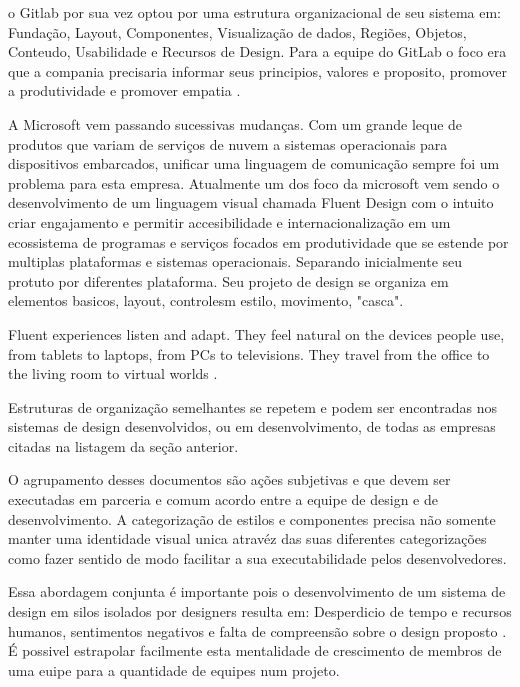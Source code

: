   o Gitlab por sua vez optou por uma estrutura organizacional de seu sistema em: Fundação, Layout, Componentes, Visualização de dados, Regiões, Objetos, Conteudo, Usabilidade e Recursos de Design. Para a equipe do GitLab o foco era que a compania precisaria informar seus principios, valores e proposito, promover a produtividade e promover empatia \cite{gitlab_design}.

  A Microsoft vem passando sucessivas mudanças. Com um grande leque de produtos que variam de serviços de nuvem a sistemas operacionais para dispositivos embarcados, unificar uma linguagem de comunicação sempre foi um problema para esta empresa. Atualmente um dos foco da microsoft vem sendo o desenvolvimento de um linguagem visual chamada Fluent Design com o intuito criar engajamento e permitir accesibilidade e internacionalização em um ecossistema de programas e serviços focados em produtividade que se estende por multiplas plataformas e sistemas operacionais. Separando inicialmente seu protuto por diferentes plataforma. Seu projeto de design se organiza em elementos basicos, layout, controlesm estilo, movimento, "casca".

\begin{citacao}[brazil]
  Fluent experiences listen and adapt. They feel natural on the devices people use, from tablets to laptops, from PCs to televisions. They travel from the office to the living room to virtual worlds \cite{microsoft_fluent}.
\end{citacao}

  Estruturas de organização semelhantes se repetem e podem ser encontradas nos sistemas de design desenvolvidos, ou em desenvolvimento, de todas as empresas citadas na listagem da seção anterior.

  O agrupamento desses documentos são ações subjetivas e que devem ser executadas em parceria e comum acordo entre a equipe de design e de desenvolvimento. A categorização de estilos e componentes precisa não somente manter uma identidade visual unica atravéz das suas diferentes categorizações como fazer sentido de modo facilitar a sua executabilidade pelos desenvolvedores.

  Essa abordagem conjunta é importante pois o desenvolvimento de um sistema de design em silos isolados por designers resulta em: Desperdicio  de tempo e recursos humanos, sentimentos negativos e falta de compreensão sobre o design proposto \cite{GuilhermeGonzalez}. É possivel estrapolar facilmente esta mentalidade de crescimento de membros de uma euipe para a quantidade de equipes num projeto.

